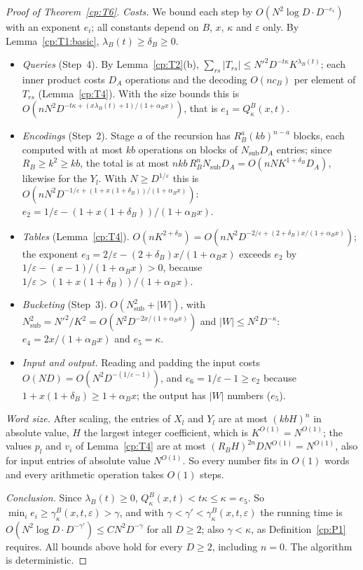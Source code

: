 \documentclass[11pt]{article}
\theoremstyle{definition}
\theoremstyle{remark}
\providecommand{\eps}{\varepsilon}
\newcommand{\abs}[1]{\lvert #1\rvert}
\newcommand{\cB}{c_B}                         %
\newcommand{\lamB}{\lambda_B}                 %
\newcommand{\delB}{\delta_B}                  %
\newcommand{\alB}{\alpha_B}                   %
\newcommand{\RB}{R_B}                         %
\newcommand{\Qgain}[2]{Q^{#1}_{#2}}           %
\newcommand{\gbound}[2]{\gamma^{#1}_{#2}}     %
\begin{document}
\begin{proof}[Proof of Theorem~\ref{cp:T6}]
\emph{Costs.} We bound each step by $O(N^2\log D\cdot D^{-e_i})$ with an exponent $e_i$; all constants depend on $B$, $x$, $\kappa$ and $\eps$ only. By Lemma~\ref{cp:T1:basic}, $\lamB(t)\ge\delB\ge0$.
\begin{itemize}
\item \emph{Queries} (Step~4). By Lemma~\ref{cp:T2}(b), $\sum_{rs}\abs{T_{rs}}\le N'^2D^{-t\kappa}K^{\lamB(t)}$; each inner product costs $D_A$ operations and the decoding $O(n\cB)$ per element of $T_{rs}$ (Lemma~\ref{cp:T4}). With the size bounds this is $O(nN^2D^{-t\kappa+(x\lamB(t)+1)/(1+\alB x)})$, that is $e_1=\Qgain B\kappa(x,t)$.
\item \emph{Encodings} (Step~2). Stage $a$ of the recursion has $\RB^a(kb)^{n-a}$ blocks, each computed with at most $kb$ operations on blocks of $N_{\mathrm{sub}}D_A$ entries; since $\RB\ge k^2\ge kb$, the total is at most $nkb\,\RB^nN_{\mathrm{sub}}D_A=O(nNK^{1+\delB}D_A)$, likewise for the $Y_l$. With $N\ge D^{1/\eps}$ this is $O(nN^2D^{-1/\eps+(1+x(1+\delB))/(1+\alB x)})$: $e_2=1/\eps-(1+x(1+\delB))/(1+\alB x)$.
\item \emph{Tables} (Lemma~\ref{cp:T4}). $O(nK^{2+\delB})=O(nN^2D^{-2/\eps+(2+\delB)x/(1+\alB x)})$; the exponent $e_3=2/\eps-(2+\delB)x/(1+\alB x)$ exceeds $e_2$ by $1/\eps-(x-1)/(1+\alB x)>0$, because $1/\eps>(1+x(1+\delB))/(1+\alB x)$.
\item \emph{Bucketing} (Step~3). $O(N_{\mathrm{sub}}^2+\abs W)$, with $N_{\mathrm{sub}}^2=N'^2/K^2=O(N^2D^{-2x/(1+\alB x)})$ and $\abs W\le N^2D^{-\kappa}$: $e_4=2x/(1+\alB x)$ and $e_5=\kappa$.
\item \emph{Input and output.} Reading and padding the input costs $O(ND)=O(N^2D^{-(1/\eps-1)})$, and $e_6=1/\eps-1\ge e_2$ because $1+x(1+\delB)\ge1+\alB x$; the output has $\abs W$ numbers ($e_5$).
\end{itemize}
\emph{Word size.} After scaling, the entries of $X_l$ and $Y_l$ are at most $(kbH)^n$ in absolute value, $H$ the largest integer coefficient, which is $K^{O(1)}=N^{O(1)}$; the values $p_l$ and $v_i$ of Lemma~\ref{cp:T4} are at most $(\RB H)^{2n}DN^{O(1)}=N^{O(1)}$, also for input entries of absolute value $N^{O(1)}$. So every number fits in $O(1)$ words and every arithmetic operation takes $O(1)$ steps.

\emph{Conclusion.} Since $\lamB(t)\ge0$, $\Qgain B\kappa(x,t)<t\kappa\le\kappa=e_5$. So $\min_ie_i\ge\gbound B\kappa(x,t,\eps)>\gamma$, and with $\gamma<\gamma'<\gbound B\kappa(x,t,\eps)$ the running time is $O(N^2\log D\cdot D^{-\gamma'})\le CN^2D^{-\gamma}$ for all $D\ge2$; also $\gamma<\kappa$, as Definition~\ref{cp:P1} requires. All bounds above hold for every $D\ge2$, including $n=0$. The algorithm is deterministic.
\end{proof}
\end{document}
